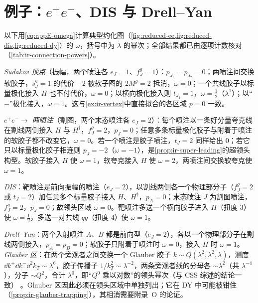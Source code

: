 \section{例子：\texorpdfstring{$e^+e^-$}{e+e-}、DIS 与 Drell--Yan}\label{sec:appE-examples}

以下用\cref{eq:appE-omega}计算典型约化图（\cref{fig:reduced-ee,fig:reduced-dis,fig:reduced-dy}）的 $\omega$，括号中为 $\lambda$ 的幂次；全部结果都已由逐项计数核对（\cref{tab:ir-connection-powers}）。

\emph{Sudakov 顶点}（振幅，两个喷注各 $e_J=1$、$f^g_J=1$）：$p_{J_1}=p_{J_2}=0$；两喷注间交换软胶子，$s^g_J=1$ 的代价 $-2$ 被软子图的 $2M^g=2$ 抵消，$\omega=0$；一个共线胶子以标量极化接入 $H$ 也不付代价，$\omega=0$；以横向极化接入则 $t_{J_1}=1$，$\omega=\frac12$（$\lambda^1$）；以“$-$”极化接入，$\omega=1$。这与\cref{ex:ir-vertex}中直接拟合的各区域 $p=0$ 一致。

\emph{$e^+e^-\to$ 两喷注}（割图，两个末态喷注各 $e_J=2$）：每个喷注以一条好分量夸克线在割线两侧接入 $H$ 与 $H^\dagger$，$f^g_J=2$，$p_J=0$；任意多条标量极化胶子与附着于喷注的软胶子都不改变它，$\omega=0$。若一个喷注是胶子喷注，$t_J=2$ 同样给出 $0$；若它只以标量极化胶子相连则 $p_J=-2$（$\omega=-1$），是\cref{prop:ir-super-leading}的超领头构型。软胶子接入 $H$ 使 $\omega=1$，软夸克接入 $H$ 使 $\omega=2$，两喷注间交换软夸克使 $\omega=1$。

\emph{DIS}：靶喷注是前向振幅的喷注（$e_J=2$），以割线两侧各一个物理部分子（$f^g_J=2$ 或 $t_J=2$）加任意多个标量胶子接入 $H$、$H^\dagger$，$p_A=0$；末态喷注 $J$ 为割图喷注，$f^g_J=2$，$p_J=0$；故领头区域 $\omega=0$。靶喷注多送一个横向胶子进入 $H$（扭度 3）使 $\omega=\frac12$，多送一对共线 $q\bar q$（扭度 4）使 $\omega=1$。

\emph{Drell--Yan}：两个入射喷注 $A$、$B$ 都是前向型（$e_J=2$），各以一个物理部分子在割线两侧接入，$p_A=p_B=0$；软胶子只附着于喷注时 $\omega=0$，接入 $H$ 时 $\omega=1$。\emph{Glauber 区}：在两个旁观者之间交换一个 Glauber 胶子 $k\sim Q(\lambda^2,\lambda^2,\lambda)$，测度 $\dd k^+\dd k^-\dd^2k_T\sim\lambda^6$，胶子传播子 $1/k_T^2\sim\lambda^{-2}$，两条旁观者线的分母各 $\sim\lambda^2$（共 $\lambda^{-4}$），分子 $\sim Q^2$，合计 $\lambda^0$，即“$Q^0$ 乘以对数”的领头幂次（与 CSS 综述的结论一致\cite[第~8.4~节]{CollinsSoperSterman1989}）%
。Glauber 区因此必须在领头区域中单独列出；它在 DY 中可能被钳住（\cref{prop:ir-glauber-trapping}），其相消需要附录~O 的论证。
